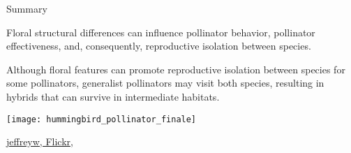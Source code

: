 \documentclass[t,hidelinks]{beamer}
\begin{document}
%
\begin{frame}[t]{Summary}
	
	\begin{multicols}{2}
	\hangpara Floral structural differences can influence pollinator behavior, pollinator effectiveness, and, consequently, reproductive isolation between species. 

	\hangpara Although floral features can promote reproductive isolation between species for some pollinators, generalist pollinators may visit both species, resulting in hybrids that can survive in intermediate habitats. 

	\columnbreak
	
		\texttt{[image: hummingbird\_pollinator\_finale]}
	\end{multicols}

	\vfilll
	
	\hfill \tiny \href{https://www.flickr.com/photos/jeffreyww/17421811000/in/photolist-egCnAb-W5cqTb-JmQo5J-NYPC2-7Tve9a-aCd9bM-7YoLY2-eeKix9-dhnGmv-nh85vv-sAP76s-6PkrUP-6r6qhK-driKBF-drdFtw-WS8wEY-drdwbv-7Ys1Pu-7YoLMx-egwBPz-9L5NHb-sqRuEw-sUo69r-9L5NHU-f9MG8d-RUtzU5-sxvkrJ-exZVce-sUcJns-rSeypr-oim7rn-drdzeb}{jeffreyw, Flickr, }
\end{frame}
%
\end{document}
